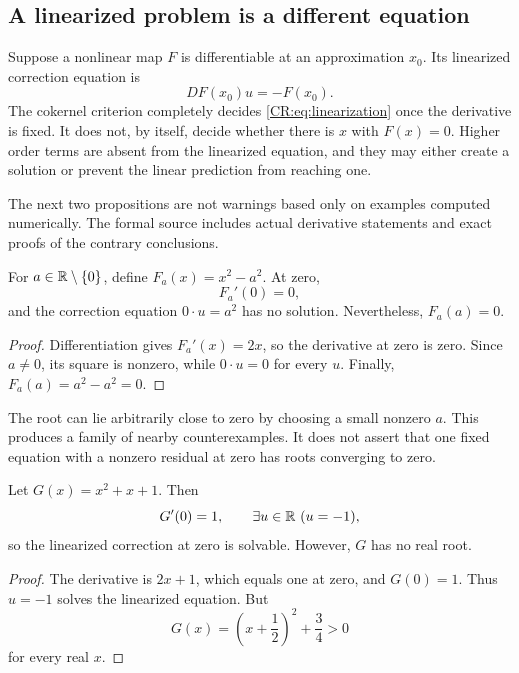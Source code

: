 \subsection{A linearized problem is a different equation}
Suppose a nonlinear map $F$ is differentiable at an approximation $x_0$. Its linearized correction equation is
\begin{equation}\label{CR:eq:linearization}
DF(x_0)u=-F(x_0).
\end{equation}
The cokernel criterion completely decides \eqref{CR:eq:linearization} once the derivative is fixed. It does not, by itself, decide whether there is $x$ with $F(x)=0$. Higher order terms are absent from the linearized equation, and they may either create a solution or prevent the linear prediction from reaching one.

The next two propositions are not warnings based only on examples computed numerically. The formal source includes actual derivative statements and exact proofs of the contrary conclusions.

\begin{CRproposition}\label{CR:prop:nonlinear-root}
For $a\in\mathbb{R}\setminus\{0\}$, define $F_a(x)=x^2-a^2$. At zero,
\[
F_a'(0)=0,
\]
and the correction equation $0\cdot u=a^2$ has no solution. Nevertheless, $F_a(a)=0$.
\end{CRproposition}
\begin{proof}
Differentiation gives $F_a'(x)=2x$, so the derivative at zero is zero. Since $a\ne0$, its square is nonzero, while $0\cdot u=0$ for every $u$. Finally, $F_a(a)=a^2-a^2=0$.
\end{proof}

The root can lie arbitrarily close to zero by choosing a small nonzero $a$. This produces a family of nearby counterexamples. It does not assert that one fixed equation with a nonzero residual at zero has roots converging to zero.

\begin{CRproposition}\label{CR:prop:no-real-root}
Let $G(x)=x^2+x+1$. Then
\[
G'(0)=1,\qquad \exists u\in\CRR\ (u=-1),
\]
so the linearized correction at zero is solvable. However, $G$ has no real root.
\end{CRproposition}
\begin{proof}
The derivative is $2x+1$, which equals one at zero, and $G(0)=1$. Thus $u=-1$ solves the linearized equation. But
\[
G(x)=\left(x+\frac12\right)^2+\frac34>0
\]
for every real $x$.
\end{proof}

